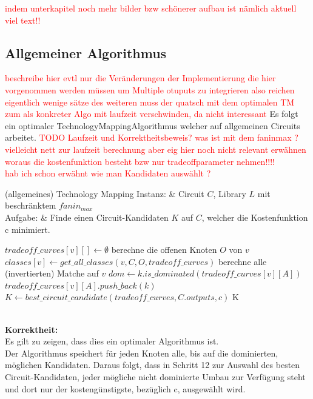 \documentclass[11pt, a4paper, german]{article}
\newcommand{\TM}{TechnologyMapping}
\begin{document}
 \textcolor{red}{ indem unterkapitel noch mehr bilder bzw schönerer aufbau ist nämlich aktuell viel text!!}
 
 \subsection{Allgemeiner Algorithmus}
 \label{subsec:allg_algorithmus}
 \textcolor{red}{beschreibe hier evtl nur die Veränderungen der Implementierung die hier vorgenommen werden müssen um Multiple otuputs zu integrieren also reichen eigentlich wenige sätze des weiteren muss der quatsch mit dem optimalen TM zum als konkreter Algo mit laufzeit verschwinden, da nicht interessant}
 Es folgt ein optimaler  \TM Algorithmus welcher auf allgemeinen Circuits arbeitet. 
 \textcolor{red}{TODO Laufzeit  und Korrektheitsbeweis? was ist mit dem faninmax ? vielleicht nett zur laufzeit berechnung aber eig hier noch nicht relevant   erwähnen woraus die kostenfunktion besteht bzw nur tradeoffparameter nehmen!!!!}\\
 \textcolor{red}{hab ich schon erwähnt wie man Kandidaten auswählt ?}
 
 \begin{problem}[framed]{(allgemeines) Technology Mapping}
  Instanz:  & Circuit $C$, Library $L$ mit beschr\"anktem $fanin_{max}$\\
  Aufgabe: &  Finde einen Circuit-Kandidaten $K$ auf $C$, welcher die Kostenfunktion c minimiert.
\end{problem}

\begin{algorithm}[H]
 \LinesNumbered
 \DontPrintSemicolon
 \caption{(allgemeines) \TM}
 {
 	$tradeoff\_curves[v][] \gets \emptyset$ \;
 	berechne die offenen Knoten $O$ von $v$\; 
 	$classes[v] \gets get\_all\_classes(v,C,  O, tradeoff\_curves)$\;
 	berechne alle (invertierten) Matche auf $v$\;
  	 {
   		{
   				{
   					$ dom \gets k.is\_dominated(tradeoff\_curves[v][A])$\;
						{$tradeoff\_curves[v][A].push\_back(k)$}
   				}
   		}
   	}
 }
 $K \gets best\_circuit\_candidate(tradeoff\_curves, C.outputs, c)$\;
\Return K
\end{algorithm}\ \\
 
{\bf Korrektheit:} \\
Es gilt zu zeigen, dass dies ein optimaler Algorithmus ist. \\
Der Algorithmus speichert für jeden Knoten alle, bis auf die dominierten, möglichen Kandidaten. Daraus folgt, dass in Schritt 12 zur Auswahl des besten Circuit-Kandidaten, jeder mögliche nicht dominierte Umbau zur Verfügung steht und dort nur der kostengünstigste, bezüglich c, ausgewählt wird. 
 
\end{document}
